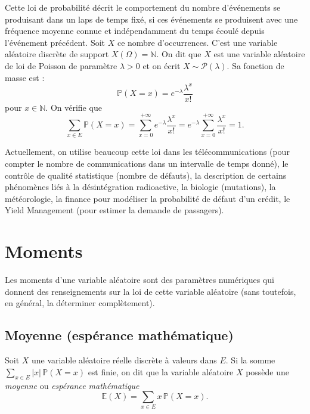 Cette loi de probabilité décrit le comportement du nombre d'événements se produisant dans un laps de temps fixé, si ces événements se produisent avec une fréquence moyenne connue et indépendamment du temps écoulé depuis l'événement précédent. Soit $X$ ce nombre d'occurrences. C'est une variable aléatoire discrète de support $X(\Omega) = \mathbb{N}$. On dit que $X$ est une variable aléatoire de loi de Poisson de paramètre $\lambda >0$ et on écrit $X \sim \mathcal{P}(\lambda)$. Sa fonction de masse est : 
\[
	\mathbb{P}(X=x) = e^{-\lambda} \frac{\lambda^x}{x!} 
\]
pour $x \in \mathbb{N}$. On vérifie que 
\[
\sum_{x \in E} \mathbb{P}(X=x) =  \sum_{x=0}^{+ \infty} e^{-\lambda} \frac{\lambda^x}{x!} = e^{-\lambda} \sum_{x=0}^{+ \infty} \frac{\lambda^x}{x!} =1.
\]\sld{\vfill\pagebreak[5]}%
\begin{center}
	
\end{center}
\sld{\vfill\pagebreak[5]}%
\begin{exemple}
	Actuellement, on utilise beaucoup cette loi dans les télécommunications (pour compter le nombre de communications dans un intervalle de temps donné), le contrôle de qualité statistique (nombre de défauts), la description de certains phénomènes liés à la désintégration radioactive, la biologie (mutations), la météorologie, la finance pour modéliser la probabilité de défaut d'un crédit, le Yield Management (pour estimer la demande de passagers).
\end{exemple}
\sld{\vfill\pagebreak[5]}%
\section{Moments}

Les moments d'une variable aléatoire sont des paramètres numériques qui donnent des renseignements sur la loi de cette variable aléatoire (sans toutefois, en général, la déterminer complètement). %

\subsection{Moyenne (espérance mathématique)}

\begin{definition}
Soit $X$ une variable aléatoire réelle discrète à valeurs dans $E$. Si la somme $\sum_{x \in E} |x| \, \mathbb{P}(X=x)$ est finie, on dit que la variable aléatoire $X$ possède une \emph{moyenne} ou \emph{espérance mathématique}
\[
\mathbb{E} (X) = \sum_{x \in E} x \, \mathbb{P}(X=x).
\]
\end{definition}

